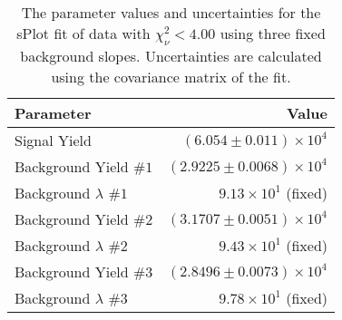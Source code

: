 
\begin{table}[ht]
    \begin{center}
        \begin{tabular}{lr}\toprule
            Parameter & Value \\\midrule
            Signal Yield & $(6.054 \pm 0.011) \times 10^{4}$ \\
            Background Yield $\#1$ & $(2.9225 \pm 0.0068) \times 10^{4}$ \\
            Background $\lambda$ $\#1$ & $9.13 \times 10^{1}$ (fixed) \\
            Background Yield $\#2$ & $(3.1707 \pm 0.0051) \times 10^{4}$ \\
            Background $\lambda$ $\#2$ & $9.43 \times 10^{1}$ (fixed) \\
            Background Yield $\#3$ & $(2.8496 \pm 0.0073) \times 10^{4}$ \\
            Background $\lambda$ $\#3$ & $9.78 \times 10^{1}$ (fixed) \\\bottomrule
        \end{tabular}
        \caption{The parameter values and uncertainties for the sPlot fit of data with $\chi^2_\nu < 4.00$ using three fixed background slopes. Uncertainties are calculated using the covariance matrix of the fit.}\label{tab:splot-fit-results-chisqdof-4.00-fixed-3}
    \end{center}
\end{table}
